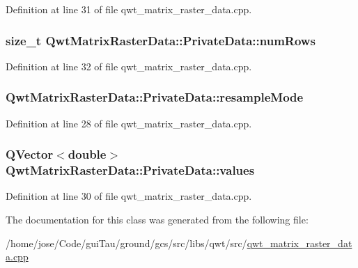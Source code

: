 Definition at line 31 of file qwt\-\_\-matrix\-\_\-raster\-\_\-data.\-cpp.

\hypertarget{class_qwt_matrix_raster_data_1_1_private_data_af7f6ad2916d2449a527c0f09b1e27c18}{
\subsubsection[{num\-Rows}]{\setlength{\rightskip}{0pt plus 5cm}size\-\_\-t Qwt\-Matrix\-Raster\-Data\-::\-Private\-Data\-::num\-Rows}}\label{class_qwt_matrix_raster_data_1_1_private_data_af7f6ad2916d2449a527c0f09b1e27c18}


Definition at line 32 of file qwt\-\_\-matrix\-\_\-raster\-\_\-data.\-cpp.

\hypertarget{class_qwt_matrix_raster_data_1_1_private_data_a9d7b97834e90e3f4187bc72c472e5a9d}{
\subsubsection[{resample\-Mode}]{ Qwt\-Matrix\-Raster\-Data\-::\-Private\-Data\-::resample\-Mode}}\label{class_qwt_matrix_raster_data_1_1_private_data_a9d7b97834e90e3f4187bc72c472e5a9d}


Definition at line 28 of file qwt\-\_\-matrix\-\_\-raster\-\_\-data.\-cpp.

\hypertarget{class_qwt_matrix_raster_data_1_1_private_data_aa84d320fb4111314a182d4f485b27118}{
\subsubsection[{values}]{\setlength{\rightskip}{0pt plus 5cm}Q\-Vector$<${\bf double}$>$ Qwt\-Matrix\-Raster\-Data\-::\-Private\-Data\-::values}}\label{class_qwt_matrix_raster_data_1_1_private_data_aa84d320fb4111314a182d4f485b27118}


Definition at line 30 of file qwt\-\_\-matrix\-\_\-raster\-\_\-data.\-cpp.



The documentation for this class was generated from the following file\-:\begin{DoxyCompactItemize}
\item 
/home/jose/\-Code/gui\-Tau/ground/gcs/src/libs/qwt/src/\hyperlink{qwt__matrix__raster__data_8cpp}{qwt\-\_\-matrix\-\_\-raster\-\_\-data.\-cpp}\end{DoxyCompactItemize}
